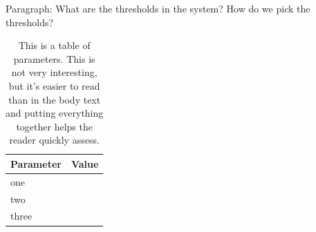 Paragraph: What are the thresholds in the system? How do we pick the thresholds?


\begin{table}
\begin{tabular}{ll}
\toprule
Parameter & Value \\
\midrule
one & \\
two & \\
three & \\
\bottomrule
\end{tabular}
\caption{This is a table of parameters. This is not very interesting, but it's easier to read than in the body text and putting everything together helps the reader quickly assess.}
\end{table}